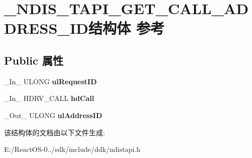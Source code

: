 \hypertarget{struct___n_d_i_s___t_a_p_i___g_e_t___c_a_l_l___a_d_d_r_e_s_s___i_d}{}\section{\+\_\+\+N\+D\+I\+S\+\_\+\+T\+A\+P\+I\+\_\+\+G\+E\+T\+\_\+\+C\+A\+L\+L\+\_\+\+A\+D\+D\+R\+E\+S\+S\+\_\+\+I\+D结构体 参考}
\label{struct___n_d_i_s___t_a_p_i___g_e_t___c_a_l_l___a_d_d_r_e_s_s___i_d}
\subsection*{Public 属性}
\begin{DoxyCompactItemize}
\item 
\mbox{\label{struct___n_d_i_s___t_a_p_i___g_e_t___c_a_l_l___a_d_d_r_e_s_s___i_d_a8c8c30e09d3295b0c34ffaa3a181135e}} 
\+\_\+\+In\+\_\+ U\+L\+O\+NG {\bfseries ul\+Request\+ID}
\item 
\mbox{\label{struct___n_d_i_s___t_a_p_i___g_e_t___c_a_l_l___a_d_d_r_e_s_s___i_d_a5d5c58dcde3f925c3a6bfa2419057f0b}} 
\+\_\+\+In\+\_\+ H\+D\+R\+V\+\_\+\+C\+A\+LL {\bfseries hd\+Call}
\item 
\mbox{\label{struct___n_d_i_s___t_a_p_i___g_e_t___c_a_l_l___a_d_d_r_e_s_s___i_d_ad85082a504fa167fec66c62b7a24142f}} 
\+\_\+\+Out\+\_\+ U\+L\+O\+NG {\bfseries ul\+Address\+ID}
\end{DoxyCompactItemize}


该结构体的文档由以下文件生成\+:\begin{DoxyCompactItemize}
\item 
E\+:/\+React\+O\+S-\/0../sdk/include/ddk/ndistapi.\+h\end{DoxyCompactItemize}
